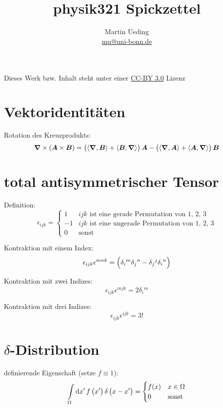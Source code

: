 

\hypersetup{
	pdftitle=
}


\title{physik321 Spickzettel}
\author{
	Martin Ueding \\
	\small{\href{mailto:mu@uni-bonn.de}{mu@uni-bonn.de}}
}



\maketitle

Dieses Werk bzw. Inhalt steht unter einer
\href{https://creativecommons.org/licenses/by/3.0/}{CC-BY 3.0} Lizenz

\section{Vektoridentitäten}

Rotation des Kreuzprodukts:
\[
	\vnabla \times \del{\vec A \times \vec B}
	= \del{\divergence{\vec B} + \inner{\vec B}\vnabla} \vec A
	- \del{\divergence{\vec A} + \inner{\vec A}\vnabla} \vec B
\]


\section{total antisymmetrischer Tensor}

Definition:
\[
	\epsilon_{ijk}
	=
	\begin{cases}
		1 & \text{$ijk$ ist eine gerade Permutation von 1, 2, 3} \\
		-1 & \text{$ijk$ ist eine ungerade Permutation von 1, 2, 3} \\
		0 & \text{sonst}
	\end{cases}
\]

Kontraktion mit einem Index:
\[
	\epsilon_{ijk} \epsilon^{mnk} = \del{
		\delta_i{}^m \delta_j{}^n - \delta_j{}^j \delta_i{}^n
	}
\]

Kontraktion mit zwei Indizes:
\[
	\epsilon_{ijk} \epsilon^{mjk} = 2 \delta_i{}^m
\]

Kontraktion mit drei Indizes:
\[
	\epsilon_{ijk} \epsilon^{ijk} = 3!
\]

\section{$\delta$-Distribution}

definierende Eigenschaft (setze $f \equiv 1$):
\[
	\intop_\Omega \dif x' \, f\del{x'} \delta\del{x - x'}
	=
	\begin{cases}
		f(x) & x \in \Omega \\
		0 & \text{sonst}
	\end{cases}
\]

